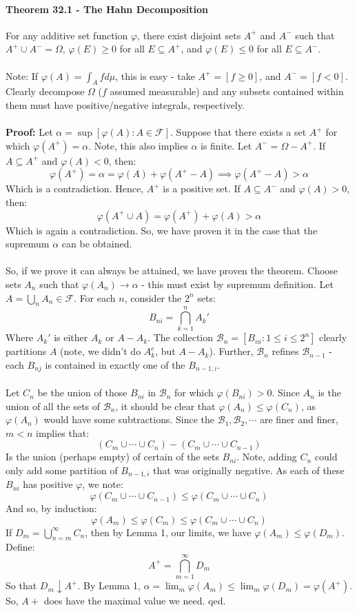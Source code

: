 \documentclass[12pt,a4paper]{article}
\newcommand{\1}[1]{\mathbbm{1}\left\{ #1 \right\}}
\newcommand{\fcal}{\mathcal{F}}
\newcommand{\bcal}{\mathcal{B}}
\begin{document}
\paragraph{Theorem 32.1 - The Hahn Decomposition} For any additive set function $\varphi$, there exist disjoint sets $A^+$ and $A^-$ such that $A^+ \cup A^- = \Omega$, $\varphi(E) \geq 0$ for all $E \subseteq A^+$, and $\varphi(E) \leq 0$ for all $E \subseteq A^-$.
\\\\
Note: If $\varphi(A) = \int_A f d\mu$, this is easy - take $A^+ = [f \geq 0]$, and $A^- = [f < 0]$. Clearly decompose $\Omega$ ($f$ assumed measurable) and any subsets contained within them must have positive/negative integrals, respectively.
\\\\
\textbf{Proof:} Let $\alpha = \sup\left[\varphi(A) : A \in \fcal\right]$. Suppose that there exists a set $A^+$ for which $\varphi(A^+) = \alpha$. Note, this also implies $\alpha$ is finite. Let $A^- = \Omega - A^+$. If $A \subseteq A^+$ and $\varphi(A) < 0$, then:
$$
	\varphi(A^+) = \alpha = \varphi(A) + \varphi(A^+ - A) \implies
	\varphi(A^+ - A) > \alpha
$$
Which is a contradiction. Hence, $A^+$ is a positive set. If $A \subseteq A^-$ and $\varphi(A) > 0$, then:
$$
	\varphi(A^+ \cup A) = \varphi(A^+) + \varphi(A) > \alpha
$$
Which is again a contradiction. So, we have proven it in the case that the supremum $\alpha$ can be obtained.
\\\\
So, if we prove it can always be attained, we have proven the theorem. Choose sets $A_n$ such that $\varphi(A_n) \to \alpha$ - this must exist by supremum definition. Let $A = \bigcup_n A_n \in \fcal$. For each $n$, consider the $2^n$ sets:
$$
	B_{ni} = \bigcap_{k=1}^n A_k'
$$
Where $A_k'$ is either $A_k$ or $A - A_k$. The collection $\bcal_n = \left[B_{ni}: 1 \leq i \leq 2^n\right]$ clearly partitions $A$ (note, we didn't do $A_k^c$, but $A - A_k$). Further, $\bcal_n$ refines $\bcal_{n-1}$ - each $B_{nj}$ is contained in exactly one of the $B_{n-1,i}$.
\\\\
Let $C_n$ be the union of those $B_{ni}$ in $\bcal_n$ for which $\varphi(B_{ni}) > 0$. Since $A_n$ is the union of all the sets of $\bcal_n$, it should be clear that $\varphi(A_n) \leq \varphi(C_n)$, as $\varphi(A_n)$ would have some subtractions. Since the $\bcal_1, \bcal_2, \cdots$ are finer and finer, $m < n$ implies that:
$$
	(C_m \cup \cdots \cup C_n) - (C_m \cup \cdots \cup C_{n-1})
$$
Is the union (perhaps empty) of certain of the sets $B_{ni}$. Note, adding $C_n$ could only add some partition of $B_{n-1,i}$ that was originally negative. As each of these $B_{ni}$ has positive $\varphi$, we note:
$$
	\varphi(C_m \cup \cdots \cup C_{n-1}) \leq \varphi(C_m \cup \cdots \cup C_n)
$$
And so, by induction:
$$
	\varphi(A_m) \leq \varphi(C_m) \leq \varphi(C_m \cup \cdots \cup C_n)
$$
If $D_m = \bigcup_{n=m}^\infty C_n$, then by Lemma 1, our limits, we have $\varphi(A_m) \leq \varphi(D_m)$. Define:
$$
	A^+ = \bigcap_{m=1}^\infty D_m
$$
So that $D_m \downarrow A^+$. By Lemma 1, $\alpha = \lim_m \varphi(A_m) \leq \lim_m \varphi(D_m) = \varphi(A^+)$. So, $A+$ does have the maximal value we need. qed.
\end{document}
